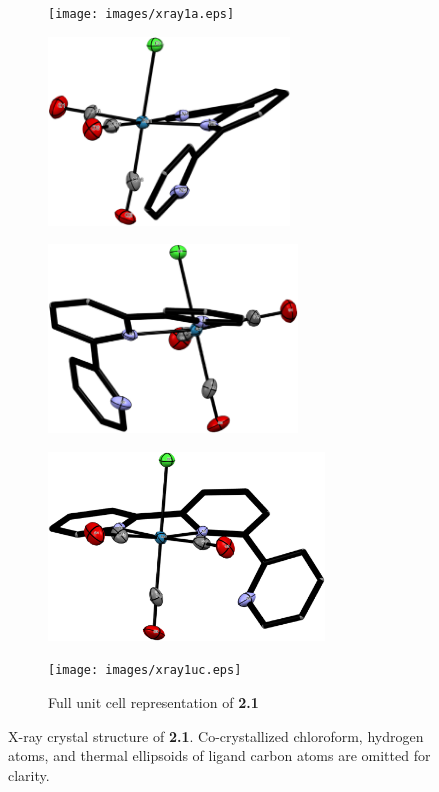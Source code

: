 \begin{figure}[!ht]
 \centering
 \begin{subfigure}[b]{0.49\textwidth}
  \texttt{[image: images/xray1a.eps]}
 \end{subfigure}
 \begin{subfigure}[b]{0.49\textwidth}
  \includegraphics[clip=true, width=\textwidth, height=50mm, keepaspectratio]{images/xray1b.eps}
 \end{subfigure}
 \begin{subfigure}[b]{0.49\textwidth}
  \includegraphics[clip=true, width=\textwidth, height=50mm, keepaspectratio]{images/xray1c.eps}
 \end{subfigure}
  \begin{subfigure}[b]{0.49\textwidth}
  \includegraphics[clip=true, width=\textwidth, height=50mm, keepaspectratio]{images/xray1d.eps}
 \end{subfigure}
 \begin{subfigure}[b]{\textwidth}
  \centering
  \texttt{[image: images/xray1uc.eps]}
  \caption{Full unit cell representation of \textbf{2.1}}
 \end{subfigure}
\caption[X-ray crystal structure of \textbf{2.1}]{X-ray crystal structure of \textbf{2.1}. Co-crystallized chloroform, hydrogen atoms, and thermal ellipsoids of ligand carbon atoms are omitted for clarity.}
\label{fig.xray21}
\end{figure}

